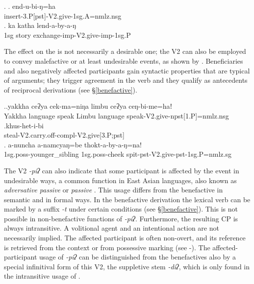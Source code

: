\ex. \ag. end-u-bi-ŋ=ha\\
		insert{\sc -3.P[pst]-V2.give-1sg.A=nmlz.nsg}\\
	\bg. ka katha lend-a-by-a-ŋ\\
	{\sc 1sg} story  exchange{\sc -imp-V2.give-imp-1sg.P}\\

The effect on the  is not necessarily a desirable one; the V2 can also be employed to 
convey malefactive or at least undesirable events, as shown by \Next. Beneficiaries and also negatively affected participants gain syntactic properties that are typical of arguments; they  trigger agreement in the verb and they qualify as antecedents of reciprocal derivations (see §\ref{benefactive}). 

\ex.\ag.yakkha ceʔya cek-ma=niŋa limbu ceʔya ceŋ-bi-me=haǃ\\
Yakkha language  speak Limbu language speak{\sc -V2.give-npst[1.P]=nmlz.nsg}\\
\bg.khus-het-i-bi\\
steal{\sc -V2.carry.off-compl-V2.give[3.P;pst]}\\
\bg. a-nuncha a-namcyaŋ=be thokt-a-by-a-ŋ=na!\\
{\sc 1sg.poss-}younger\_sibling {\sc 1sg.poss-}cheek  spit{\sc -pst-V2.give-pst-1sg.P=nmlz.sg}\\


The   V2 \emph{-piʔ}  can also indicate that some participant is affected by the event in undesirable ways, a common function in East Asian languages, also known as \emph{adversative passive} or \emph{ passive} \citep{Keenanetal2007Passives, Yapetal1998_give}. This usage differs from the benefactive in semantic and in formal ways.  In the benefactive derivation the lexical verb can be marked by a suffix \emph{-t} under certain conditions (see §\ref{benefactive}). This is not possible in non-benefactive functions of  \emph{-piʔ}.  Furthermore, the resulting CP is always intransitive. A volitional agent  and an intentional action are not necessarily implied. The affected participant is often non-overt, and its reference is retrieved from the context or from possessive marking (see \Next[c]-\Next[d]). The affected-participant usage of \emph{-piʔ} can be distinguished from the benefactives also by a special infinitival form of this V2, the suppletive stem \emph{-diʔ}, which is only found in the intransitive usage of . 

